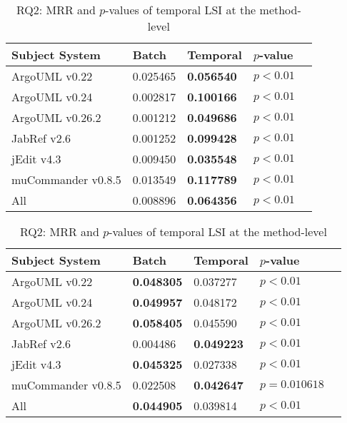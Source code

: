 \begin{table}[t]
\renewcommand{\arraystretch}{1.3}
\footnotesize
\centering
\caption{RQ2: MRR and $p$-values of temporal LSI at the class-level}
\begin{tabular}{l|ll|ll}
\toprule
Subject System & Batch & Temporal & $p$-value  \\
\midrule
ArgoUML v0.22 & 0.025465 & {\bf 0.056540 } & $p < 0.01$ \\
ArgoUML v0.24 & 0.002817 & {\bf 0.100166 } & $p < 0.01$ \\
ArgoUML v0.26.2 & 0.001212 & {\bf 0.049686 } & $p < 0.01$ \\
JabRef v2.6 & 0.001252 & {\bf 0.099428 } & $p < 0.01$ \\
jEdit v4.3 & 0.009450 & {\bf 0.035548 } & $p < 0.01$ \\
muCommander v0.8.5 & 0.013549 & {\bf 0.117789 } & $p < 0.01$ \\
\midrule
All & 0.008896 & {\bf 0.064356 } & $p < 0.01$ \\
\bottomrule
\end{tabular}
\label{table:rq2:class:lsi}
\caption{RQ2: MRR and $p$-values of temporal LSI at the method-level}
\begin{tabular}{l|ll|ll}
\toprule
Subject System & Batch & Temporal & $p$-value  \\
\midrule
ArgoUML v0.22 & {\bf 0.048305 } & 0.037277 & $p < 0.01$ \\
ArgoUML v0.24 & {\bf 0.049957 } & 0.048172 & $p < 0.01$ \\
ArgoUML v0.26.2 & {\bf 0.058405 } & 0.045590 & $p < 0.01$ \\
JabRef v2.6 & 0.004486 & {\bf 0.049223 } & $p < 0.01$ \\
jEdit v4.3 & {\bf 0.045325 } & 0.027338 & $p < 0.01$ \\
muCommander v0.8.5 & 0.022508 & {\bf 0.042647 } & $p = 0.010618$ \\
\midrule
All & {\bf 0.044905 } & 0.039814 & $p < 0.01$ \\
\bottomrule
\end{tabular}
\label{table:rq2:method:lsi}
\end{table}
